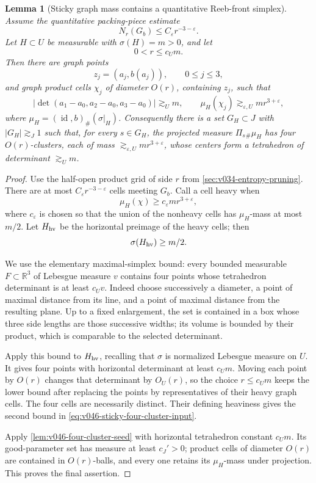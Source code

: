 \documentclass[10pt]{article}
\newtheorem{lemma}[theorem]{Lemma}
\newcommand{\R}{\mathbb R}
\newcommand{\id}{\operatorname{id}}
\begin{document}
\begin{lemma}[Sticky graph mass contains a quantitative Reeb-front simplex]
\label{lem:v046-sticky-four-cluster-extraction}
Assume the quantitative packing-piece estimate
\[
N_r(G_b)\le C_\varepsilon r^{-3-\varepsilon}.
\]
Let \(H\subset U\) be measurable with \(\sigma(H)=m>0\), and let
\[
0<r\le c_Um.
\]
Then there are graph points
\[
z_j=(a_j,b(a_j)),
\qquad
0\le j\le3,
\]
and graph product cells \(\chi_j\) of diameter \(O(r)\), containing \(z_j\), such that
\begin{equation}
\label{eq:v046-sticky-four-cluster-input}
\boxed{
\left|
\det(a_1-a_0,a_2-a_0,a_3-a_0)
\right|
\gtrsim_U
m,
\qquad
\mu_H(\chi_j)
\gtrsim_{\varepsilon,U}
m r^{3+\varepsilon},
}
\end{equation}
where \(\mu_H=(\id,b)_\#(\sigma|_H)\).  Consequently there is a set
\(G_H\subset J\) with \(|G_H|\gtrsim_J1\) such that, for every \(s\in G_H\), the projected measure
\(\Pi_s{}_\#\mu_H\) has four \(O(r)\)-clusters, each of mass
\(\gtrsim_{\varepsilon,U}mr^{3+\varepsilon}\), whose centers form a tetrahedron of determinant
\(\gtrsim_Um\).
\end{lemma}

\begin{proof}
Use the half-open product grid of side \(r\) from \cref{sec:v034-entropy-pruning}.  There are at
most \(C_\varepsilon r^{-3-\varepsilon}\) cells meeting \(G_b\).  Call a cell heavy when
\[
\mu_H(\chi)\ge c_\varepsilon m r^{3+\varepsilon},
\]
where \(c_\varepsilon\) is chosen so that the union of the nonheavy cells has
\(\mu_H\)-mass at most \(m/2\).  Let \(H_{\rm hv}\) be the horizontal preimage of the heavy cells;
then
\[
\sigma(H_{\rm hv})\ge m/2.
\]

We use the elementary maximal-simplex bound: every bounded measurable
\(F\subset\R^3\) of Lebesgue measure \(v\) contains four points whose tetrahedron determinant is at
least \(c_Uv\).  Indeed choose successively a diameter, a point of maximal distance from its line,
and a point of maximal distance from the resulting plane.  Up to a fixed enlargement, the set is
contained in a box whose three side lengths are those successive widths; its volume is bounded by
their product, which is comparable to the selected determinant.

Apply this bound to \(H_{\rm hv}\), recalling that \(\sigma\) is normalized Lebesgue measure on
\(U\).  It gives four points with horizontal determinant at least \(c_Um\).  Moving each point by
\(O(r)\) changes that determinant by \(O_U(r)\), so the choice \(r\le c_Um\) keeps the lower bound
after replacing the points by representatives of their heavy graph cells.  The four cells are
necessarily distinct.  Their defining heaviness gives the second bound in
\eqref{eq:v046-sticky-four-cluster-input}.

Apply \cref{lem:v046-four-cluster-seed} with horizontal tetrahedron constant \(c_Um\).  Its
good-parameter set has measure at least \(c_J'>0\); product cells of diameter \(O(r)\) are contained
in \(O(r)\)-balls, and every one retains its \(\mu_H\)-mass under projection.  This proves the final
assertion.
\end{proof}
\end{document}

